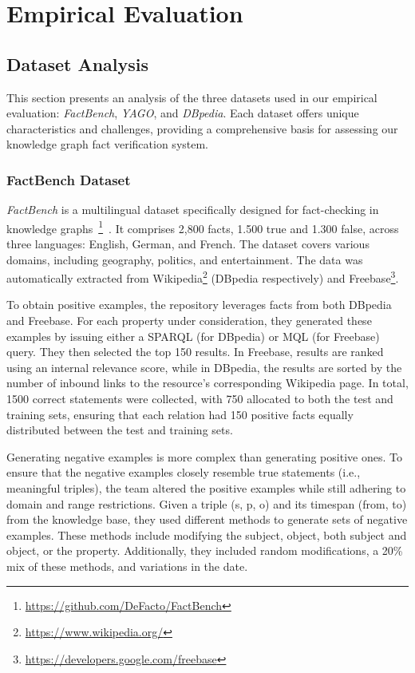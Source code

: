 \chapter{Empirical Evaluation}\label{ch:empirical-evaluation}

\section{Dataset Analysis}\label{sec:empirical-evaluation:dataset-analysis}
This section presents an analysis of the three datasets used in our empirical evaluation: \textit{FactBench}, \textit{YAGO}, and \textit{DBpedia}.
Each dataset offers unique characteristics and challenges, providing a comprehensive basis for assessing our knowledge graph fact verification system.
\subsection{FactBench Dataset}\label{subsec:empirical-evaluation:dataset-analysis:factbench}
\textit{FactBench} is a multilingual dataset specifically designed for fact-checking in knowledge graphs~\footnote{\url{https://github.com/DeFacto/FactBench}}~\cite{GERBER201585}.
It comprises 2,800 facts, 1.500 true and 1.300 false, across three languages: English, German, and French.
The dataset covers various domains, including geography, politics, and entertainment.
The data was automatically extracted from Wikipedia\footnote{\url{https://www.wikipedia.org/}} (DBpedia respectively) and Freebase\footnote{\url{https://developers.google.com/freebase}}.

To obtain positive examples, the repository leverages facts from both DBpedia and Freebase.
For each property under consideration, they generated these examples by issuing either a SPARQL (for DBpedia) or MQL (for Freebase) query.
They then selected the top 150 results.
In Freebase, results are ranked using an internal relevance score, while in DBpedia, the results are sorted by the number of inbound links to the resource’s corresponding Wikipedia page.
In total, 1500 correct statements were collected, with 750 allocated to both the test and training sets, ensuring that each relation had 150 positive facts equally distributed between the test and training sets.

Generating negative examples is more complex than generating positive ones.
To ensure that the negative examples closely resemble true statements (i.e., meaningful triples), the team altered the positive examples while still adhering to domain and range restrictions.
Given a triple (s, p, o) and its timespan (from, to) from the knowledge base, they used different methods to generate sets of negative examples.
These methods include modifying the subject, object, both subject and object, or the property.
Additionally, they included random modifications, a 20\% mix of these methods, and variations in the date.


